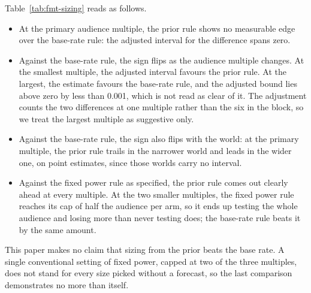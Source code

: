 \begin{table}[t]\centering\scriptsize
\caption{Test-and-roll sizes on the headline archive, broken down by audience multiple. Relative regret gives the share of an oracle's gain that is lost, so never testing equals 1. The worlds at 0.67 and 1.5 rescale the fitted distribution of effects. Sizes are stated as impressions per arm. Adjusted bounds apply to the two primary differences. When a difference is negative it favours the prior rule. The last block gives the design's feasibility check: the units are origin-and-cell pairs, and sizing would not count as evaluated if fewer than half had 100 scored rows or if the rules picked sizes within 10 percent of each other in over 80 percent of them.}
\label{tab:fmt-sizing}

\end{table}

Table~\ref{tab:fmt-sizing} reads as follows.
\begin{itemize}
\item At the primary audience multiple, the prior rule shows no measurable edge over the base-rate rule: the adjusted interval for the difference spans zero.
\item Against the base-rate rule, the sign flips as the audience multiple changes. At the smallest multiple, the adjusted interval favours the prior rule. At the largest, the estimate favours the base-rate rule, and the adjusted bound lies above zero by less than 0.001, which is not read as clear of it. The adjustment counts the two differences at one multiple rather than the six in the block, so we treat the largest multiple as suggestive only.
\item Against the base-rate rule, the sign also flips with the world: at the primary multiple, the prior rule trails in the narrower world and leads in the wider one, on point estimates, since those worlds carry no interval.
\item Against the fixed power rule as specified, the prior rule comes out clearly ahead at every multiple. At the two smaller multiples, the fixed power rule reaches its cap of half the audience per arm, so it ends up testing the whole audience and losing more than never testing does; the base-rate rule beats it by the same amount.
\end{itemize}
This paper makes no claim that sizing from the prior beats the base rate. A single conventional setting of fixed power, capped at two of the three multiples, does not stand for every size picked without a forecast, so the last comparison demonstrates no more than itself.

